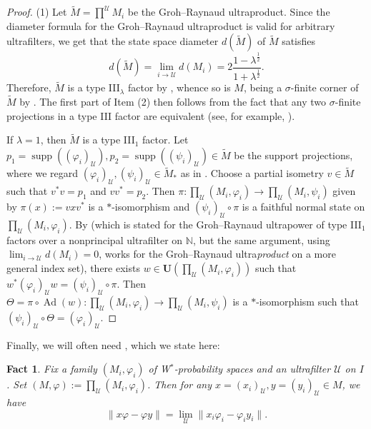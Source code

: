 \documentclass[12pt]{amsart}
\newtheorem{fact}[thm]{Fact}
\theoremstyle{definition}
\newcommand{\N}{\mathbb{N}}
\def\cal{\mathcal}
\def\u{\mathsf 1}
\newcommand\cU{{\cal U}}
\def \u{\mathcal U}
\begin{document}
\begin{proof}
(1) Let $\widetilde{M}=\prod^{\cU}M_i$ be the Groh--Raynaud ultraproduct. Since the diameter formula for the Groh--Raynaud ultraproduct \cite[Lemma 6.10]{AH14} is valid for arbitrary ultrafilters, we get that the state space diameter $d(\widetilde{M})$ of $\widetilde{M}$ satisfies \[\displaystyle d(\widetilde{M})=\lim_{i\to \cU}d(M_i)=2\frac{1-\lambda^{\frac{1}{2}}}{1+\lambda^{\frac{1}{2}}}.\] Therefore, $\widetilde{M}$ is a type III\(_{\lambda}\) factor by \cite{CHS83diameter, HaagerupStormer90}, whence so is $M$, being a $\sigma$-finite corner of $\widetilde{M}$ by \cite[Proposition 3.15]{AH14}. The first part of Item (2) then follows from the fact that any two $\sigma$-finite projections in a type III factor are equivalent (see, for example, \cite[Proposition 1.39]{Takesaki1}). 

If $\lambda=1$, then $\widetilde{M}$ is a type III$_1$ factor. Let $p_1=\operatorname{supp}((\varphi_i)_{\u}), p_2=\operatorname{supp}((\psi_i)_{\u})\in \widetilde{M}$ be the support projections, where we regard $(\varphi_i)_{\u},(\psi_i)_{\u}\in \widetilde{M}_*$ as in \cite[Theorem 3.24]{AH14}. Choose a partial isometry $v\in \widetilde{M}$ such that $v^*v=p_1$ and $vv^*=p_2$. Then $\pi:\prod_\u (M_i,\varphi_i)\to \prod_\u (M_i,\psi_i)$ given by $\pi(x):=vxv^*$ is a $*$-isomorphism and $(\psi_i)_{\u}\circ \pi$ is a faithful normal state on $\prod_{\u}(M_i,\varphi_i)$. 
By \cite[Theorem 4.20]{AH14} (which is stated for the Groh--Raynaud ultrapower of type III$_1$ factors over a nonprincipal ultrafilter on $\N$, but the same argument, using $\lim_{i\to \u}d(M_i)=0$, works for the Groh--Raynaud ultra\emph{product} on a more general index set), there exists $w\in \mathbf{U}(\prod_{\u}(M_i,\varphi_i))$ such that $w^*(\varphi_i)_{\u}w=(\psi_i)_{\u}\circ \pi$. Then $\Theta=\pi\circ \operatorname{Ad}(w)\colon \prod_{\u}(M_i,\varphi_i)\to \prod_{\u}(M_i,\psi_i)$ is a $*$-isomorphism such that $(\psi_i)_{\u}\circ \Theta=(\varphi_i)_{\u}$. 
\end{proof}

Finally, we will often need \cite[Lemma 4.36]{AH14}, which we state here:

\begin{fact}\label{ultralimitbimodule}
Fix a family $(M_i,\varphi_i)$ of W$^*$-probability spaces and an ultrafilter $\u$ on $I$.  Set $(M,\varphi):=\prod_\u (M_i,\varphi_i)$.  Then for any $x=(x_i)_\u,y=(y_i)_\u\in M$, we have
$$\|x\varphi -\varphi y\|=\lim_\u \|x_i\varphi_i -\varphi_i y_i\|.$$
\end{fact}
\end{document}
